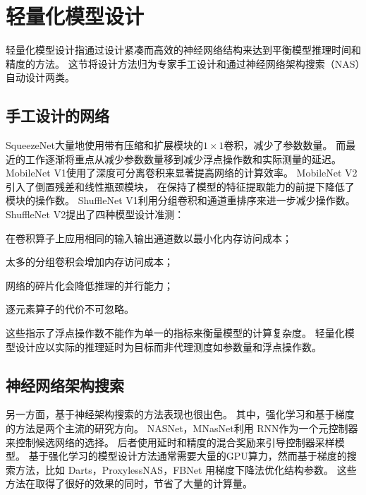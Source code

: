 \section{轻量化模型设计}
轻量化模型设计指通过设计紧凑而高效的神经网络结构来达到平衡模型推理时间和精度的方法。
这节将设计方法归为专家手工设计和通过神经网络架构搜索（NAS）自动设计两类。

\subsection{手工设计的网络}
SqueezeNet\cite{iandola2016squeezenet}大量地使用带有压缩和扩展模块的$1\times 1$卷积，减少了参数数量。
而最近的工作逐渐将重点从减少参数数量移到减少浮点操作数和实际测量的延迟。
MobileNet V1\cite{howard2017mobilenets}使用了深度可分离卷积来显著提高网络的计算效率。
MobileNet V2\cite{sandler2018mobilenetv2}引入了倒置残差和线性瓶颈模块，
在保持了模型的特征提取能力的前提下降低了模块的操作数。
ShuffleNet V1\cite{zhang2018shufflenet}利用分组卷积和通道重排序来进一步减少操作数。
ShuffleNet V2\cite{ma2018shufflenet}提出了四种模型设计准测：
\begin{enumerate*}
    \item 在卷积算子上应用相同的输入输出通道数以最小化内存访问成本；
    \item 太多的分组卷积会增加内存访问成本；
    \item 网络的碎片化会降低推理的并行能力；
    \item 逐元素算子的代价不可忽略。
\end{enumerate*}
这些指示了浮点操作数不能作为单一的指标来衡量模型的计算复杂度。
轻量化模型设计应以实际的推理延时为目标而非代理测度如参数量和浮点操作数。

\subsection{神经网络架构搜索}
另一方面，基于神经架构搜索的方法表现也很出色。
其中，强化学习和基于梯度的方法是两个主流的研究方向。
NASNet\cite{zoph2018learning}，MNasNet\cite{tan2019mnasnet}利用
RNN作为一个元控制器来控制候选网络的选择。
后者使用延时和精度的混合奖励来引导控制器采样模型。
基于强化学习的模型设计方法通常需要大量的GPU算力，然而基于梯度的搜索方法，比如
Darts\cite{liu2018darts}，ProxylessNAS\cite{cai2018proxylessnas}，FBNet\cite{wu2019fbnet}
用梯度下降法优化结构参数。
这些方法在取得了很好的效果的同时，节省了大量的计算量。